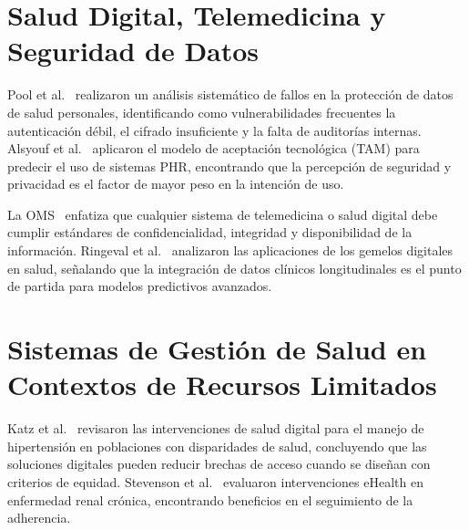 \documentclass[12pt, letterpaper]{report}
\begin{document}
\section{Salud Digital, Telemedicina y Seguridad de Datos}

Pool et al.~\cite{pool2024systematic} realizaron un análisis sistemático de fallos en
la protección de datos de salud personales, identificando como vulnerabilidades
frecuentes la autenticación débil, el cifrado insuficiente y la falta de auditorías
internas. Alsyouf et al.~\cite{alsyouf2023use} aplicaron el modelo de aceptación
tecnológica (TAM) para predecir el uso de sistemas PHR, encontrando que la percepción
de seguridad y privacidad es el factor de mayor peso en la intención de uso.

La OMS~\cite{world2022consolidated} enfatiza que cualquier sistema de telemedicina o
salud digital debe cumplir estándares de confidencialidad, integridad y disponibilidad
de la información. Ringeval et al.~\cite{ringeval2025advancing} analizaron las
aplicaciones de los gemelos digitales en salud, señalando que la integración de datos
clínicos longitudinales es el punto de partida para modelos predictivos avanzados.

\section{Sistemas de Gestión de Salud en Contextos de Recursos Limitados}

Katz et al.~\cite{katz2024digital} revisaron las intervenciones de salud digital para
el manejo de hipertensión en poblaciones con disparidades de salud, concluyendo que
las soluciones digitales pueden reducir brechas de acceso cuando se diseñan con
criterios de equidad. Stevenson et al.~\cite{stevenson2019ehealth} evaluaron
intervenciones eHealth en enfermedad renal crónica, encontrando beneficios en el
seguimiento de la adherencia.
\end{document}
